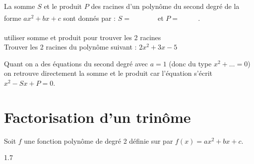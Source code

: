     \begin{bprop}
        La somme $S$ et le produit $P$ des racines d'un polynôme du second degré de la forme $ax^2+bx+c$ sont donnés par : $S=\quad\quad\phantom{- \dfrac{b}{a}}$  et $P= \quad\quad\phantom{\dfrac{c}{a}}$. 
    \end{bprop}
    
    \begin{bdemo}
    \end{bdemo}
    
    \begin{bmethodet}{utiliser somme et produit pour trouver les 2 racines}
        \\
        Trouver les 2 racines du polynôme suivant : $2x^2+3x-5$\\
    \end{bmethodet}

	\begin{brmq}
		Quant on a des équations du second degré avec $a=1$ (donc du type $x^2+\ldots=0$) on retrouve directement la somme et le produit car l'équation s'écrit $x^2-Sx+P=0$.
	\end{brmq}
        
    
\section{Factorisation d'un trinôme}

    \begin{bprop}
        Soit $f$ une fonction polynôme de degré 2 définie sur \R  par $f(x)=ax^2+bx+c$.
        \begin{spacing}{1.7}
        	\begin{itemProp}
        		\item \pointille[\textwidth-1cm]
        		\pointille[\textwidth-1cm]
        		\item \pointille[\textwidth-1cm]
        		\pointille[\textwidth-1cm]
        	\end{itemProp}
        \end{spacing}
    \end{bprop}
    
